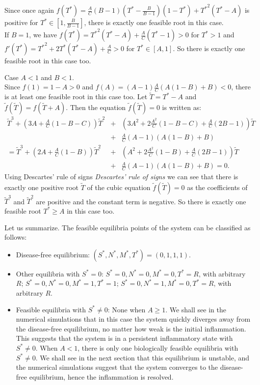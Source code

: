 \documentclass[a4paper, 12pt]{article}
\providecommand{\DIFaddtex}[1]{{\protect\color{blue} \sf #1}} %
\providecommand{\DIFdeltex}[1]{{\protect\color{red} \scriptsize #1}} %
\providecommand{\DIFaddbegin}{} %
\providecommand{\DIFaddend}{} %
\providecommand{\DIFdelbegin}{} %
\providecommand{\DIFdelend}{} %
\providecommand{\DIFadd}[1]{\texorpdfstring{\DIFaddtex{#1}}{#1}} %
\providecommand{\DIFdel}[1]{\texorpdfstring{\DIFdeltex{#1}}{}} %
\begin{document}
\begin{description}
Since once again $f(T^*)=\frac{A}{C}(B-1)(T^*-\frac{B}{B-1})(1-T^*)+{T^*}^2(T^*-A)$ is positive for $T^* \in [1, \frac{B}{B-1}]$, there is exactly one feasible root in this case.\\
If $B=1$, we have $f(T^*)={T^*}^2(T^*-A)+\frac{A}{C}(T^*-1)>0$ for $T^*>1$ and $f'(T^*)={T^*}^2+2{T^*}({T^*}-A)+\frac{A}{C}>0$ for $T^* \in [A,1]$. 
So there is exactly one feasible root in this case too.
\item[-] Case $A < 1$ and $B < 1$.\\
Since $f(1)=1-A>0$ and $f(A)=(A-1)\frac{A}{C}(A(1-B)+B)<0$, there is at least one feasible root in this case too.
Let $\tilde{T}=T^*-A$ and $\tilde{f}(\tilde{T})=f(\tilde{T}+A)$. Then the equation $\tilde{f}(\tilde{T})=0$ is written as:
\begin{eqnarray*}
\tilde{T}^3 +\left(3A+\frac{A}{C}(1-B-C)\right)\tilde{T}^2&+&\left(3A^2+2\frac{A^2}{C}(1-B-C)+\frac{A}{C}(2B-1)\right)\tilde{T}\\
&+&\frac{A}{C}(A-1)\left(A(1-B)+B\right)\\
    =\tilde{T}^3+\left(2A+\frac{A}{C}(1-B)\right)\tilde{T}^2&+&\left(A^2+2\frac{A^2}{C}(1-B)+\frac{A}{C}(2B-1)\right)\tilde{T}\\
    &+&\frac{A}{C}(A-1)\left(A(1-B)+B\right)=0.
    \end{eqnarray*}
    Using \DIFdelbegin %
\DIFdel{Descartes' rule of signs}%
\DIFdelend \DIFaddbegin \DIFadd{\textsl{Descartes' rule of signs} }\DIFaddend we can see that there is exactly one positive root $\tilde{T}$ 
    of the cubic equation $\tilde{f}(\tilde{T})=0$  as the coefficients of $\tilde{T}^3$ and $\tilde{T}^2$ are positive and the constant term is negative. 
    So there is exactly one feasible root $T^*\geq A$ in this case too.
\end{description}
\par\noindent Let us summarize. The feasible equilibria points of the system can be classified as follows:
\begin{itemize}
\item Disease-free equilibrium: $(S^*, N^*, M^*, T^*) = (0, 1, 1, 1)$.
\item Other equilibria with $S^* = 0$: 
$S^* = 0, N^* = 0, M^* = 0, T^* = R$, with arbitrary $R$;
 $S^* = 0, N^* = 0, M^* = 1, T^* = 1$;
 $S^* = 0, N^* = 1, M^* = 0, T^* = R$, with arbitrary $R$.
\item Feasible equilibria with $S^* \neq 0$: 
None when $A \geq 1$. We shall see in the numerical simulations that in this case the system quickly diverges away from the disease-free equilibrium, no matter how weak is the initial inflammation. This suggests that the system is in a persistent inflammatory state with $S^* \neq 0$.
When $A < 1$, there is only one biologically feasible equilibria with $S^* \neq 0$. We shall see in the next section that this equilibrium is unstable, and the numerical simulations suggest that the system converges to the disease-free equilibrium, hence the inflammation is resolved.
\end{itemize} 
%     
\end{document}
